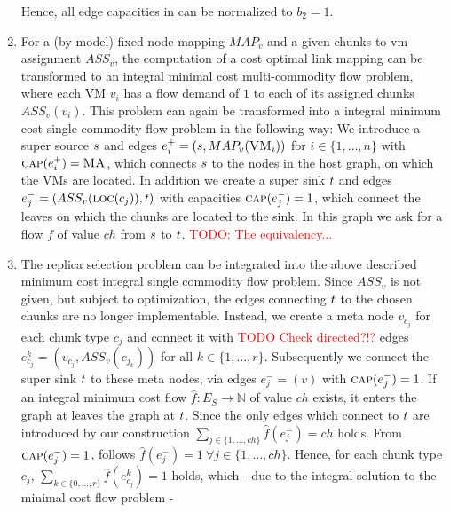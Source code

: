 \documentclass[9pt,twocolumn]{scrartcl}
\newcommand{\Capacity}{\ensuremath{\textsc{cap}}}
\newcommand{\VM}{\textsc{VM}}
\newcommand{\Chunk}{\ensuremath{c}}
\newcommand{\carlo}[1]{\textcolor{red}{#1}}
\newcommand{\MaFactor}{\ensuremath{\textsc{MA}}}
\newcommand{\RedundancyFactor}{\ensuremath{r}}
\newcommand{\VmChunkAssignment}{\ensuremath{ASS_v}}
\newcommand{\NodeMapping}{\ensuremath{MAP_v}}
\newcommand{\ChunkLocation}{\ensuremath{\textsc{loc}}}
\newcommand{\VirtualNode}{\ensuremath{v}}
\newcommand{\SubstrateEdges}{\ensuremath{E_S}}
\newcommand{\SubstrateNode}{\ensuremath{v}}
\newcommand{\SubstrateEdge}{\ensuremath{e}}
\newcommand{\CostTrans}{\ensuremath{b_2}}
\newcommand{\Vms}{\ensuremath{n}}
\newcommand{\ChunkTypes}{\ensuremath{ch}}
\begin{document}
\begin{enumerate}
Hence, all edge capacities in can be normalized to $\CostTrans = 1$.
\item For a (by model) fixed node mapping $\NodeMapping$ and a given chunks to
vm assignment $\VmChunkAssignment$, the computation of a cost
optimal link mapping can be transformed to an integral minimal cost multi-commodity
flow problem, where each VM $\VirtualNode_i$ has a flow demand of $1$ to each
of its assigned chunks $\VmChunkAssignment(\VirtualNode_i)$. This problem can
again be transformed into a integral minimum cost single commodity flow problem
in the following way:
We introduce a
super source $s$ and edges $\SubstrateEdge_i^+ = (\Source,
\NodeMapping(\VM_i))$ for
$i \in \{1,\dots,\Vms\}$ with $\Capacity(\SubstrateEdge_i^+) = \MaFactor$,
which connects $s$
to the nodes in the host graph, on which the VMs are located.
In addition we create a super sink $t$ and edges $\SubstrateEdge_j^- =
(\VmChunkAssignment(\ChunkLocation(\Chunk_j)), \Sink)$ with capacities
$\Capacity(\SubstrateEdge_j^-) = 1$, which connect the leaves on which the
chunks are located to the sink. In this graph we ask for a flow $f$
of value $\ChunkTypes$ from $s$ to $t$. \carlo{TODO: The
equivalency...}
\item The replica selection problem can be integrated into the above described
minimum cost integral single commodity flow problem. Since $\VmChunkAssignment$
is not given, but subject to optimization, the edges connecting $t$ to the
chosen chunks are no longer implementable. Instead, we create a meta node
$\SubstrateNode_{\Chunk_j}$ for each chunk type
$\Chunk_j$ and connect it with \carlo{TODO Check directed?!?} edges
$\SubstrateEdge_{\Chunk_j}^k = (\SubstrateNode_{\Chunk_j},
\VmChunkAssignment(\Chunk_{j_k}))$ for all $k \in
\{1,\dots,\RedundancyFactor\}$. Subsequently we connect the super sink
$t$ to these meta nodes, via
edges $\SubstrateEdge_j^- = (\SubstrateNode)$ with
$\Capacity(\SubstrateEdge_j^-) = 1$. If an integral minimum cost flow $\hat f
: \SubstrateEdges \rightarrow \mathbb{N}$ of value $\ChunkTypes$ exists, it
enters the graph at leaves the graph at $t$. Since the only
edges which connect to $t$ are introduced by our construction $\sum_{j\in
\{1,\dots,\ChunkTypes\}} \hat f(\SubstrateEdge_j^-) = \ChunkTypes$ holds. From
$\Capacity(\SubstrateEdge_j^-) = 1$, follows $\hat f(\SubstrateEdge_j^-) = 1 ~
\forall j \in \{1,\dots, \ChunkTypes\}$. Hence, for each chunk type $\Chunk_j$,
$\sum_{k \in \{0,\dots,\RedundancyFactor\}}\hat f(\SubstrateEdge_{c_j}^k) = 1$
holds, which - due to the integral solution to the minimal cost flow problem -

\end{enumerate}
\end{document}
